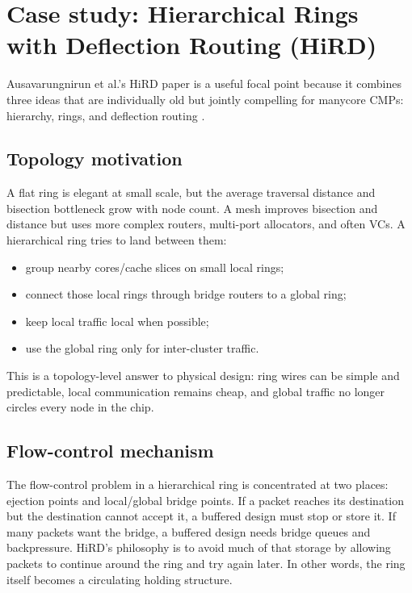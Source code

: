 \documentclass[11pt]{article}
\begin{document}
\section{Case study: Hierarchical Rings with Deflection Routing (HiRD)}

Ausavarungnirun et al.'s HiRD paper is a useful focal point because it combines three ideas that are individually old but jointly compelling for manycore CMPs: hierarchy, rings, and deflection routing \cite{Ausavarungnirun2014HiRD}.

\subsection{Topology motivation}

A flat ring is elegant at small scale, but the average traversal distance and bisection bottleneck grow with node count. A mesh improves bisection and distance but uses more complex routers, multi-port allocators, and often VCs. A hierarchical ring tries to land between them:

\begin{itemize}
  \item group nearby cores/cache slices on small local rings;
  \item connect those local rings through bridge routers to a global ring;
  \item keep local traffic local when possible;
  \item use the global ring only for inter-cluster traffic.
\end{itemize}

This is a topology-level answer to physical design: ring wires can be simple and predictable, local communication remains cheap, and global traffic no longer circles every node in the chip.

\subsection{Flow-control mechanism}

The flow-control problem in a hierarchical ring is concentrated at two places: ejection points and local/global bridge points. If a packet reaches its destination but the destination cannot accept it, a buffered design must stop or store it. If many packets want the bridge, a buffered design needs bridge queues and backpressure. HiRD's philosophy is to avoid much of that storage by allowing packets to continue around the ring and try again later. In other words, the ring itself becomes a circulating holding structure.
\end{document}
